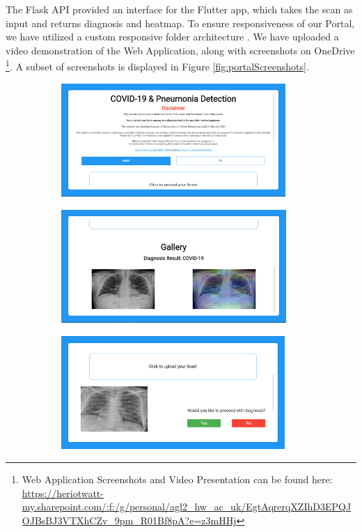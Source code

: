 The Flask API provided an interface for the Flutter app, which takes the scan as input and returns diagnosis and heatmap. To ensure responsiveness of our Portal, we have utilized a custom responsive folder architecture \cite{agl2020}. We have uploaded a video demonstration of the Web Application, along with screenshots on OneDrive \footnote{Web Application Screenshots and Video Presentation can be found here: \url{https://heriotwatt-my.sharepoint.com/:f:/g/personal/agl2_hw_ac_uk/EgtAqrerqXZIhD3EPQJOJBsBJ3VTXhCZv_9pm_R01Bf8pA?e=z3mHHj}}. A subset of screenshots is displayed in Figure \ref{fig:portalScreenshots}.

\begin{figure}[H]
        \begin{subfigure}[b]{0.5\textwidth}
                \includegraphics[width=\linewidth, height=4.3cm]{Images/Website Screenshot 1.png}
        \end{subfigure}%
        \begin{subfigure}[b]{0.5\textwidth}
                \includegraphics[width=\linewidth, height=4.3cm]{Images/Website Screenshot 2.png}
        \end{subfigure}%
        \vspace{0.8em}
        \begin{subfigure}[b]{0.5\textwidth}
                \includegraphics[width=\linewidth, height=4.3cm]{Images/Website Screenshot 5.png}

\end{subfigure}
\end{figure}
